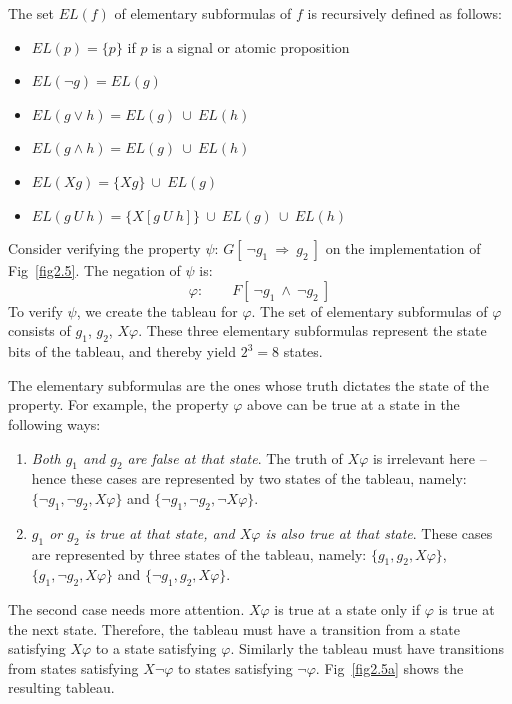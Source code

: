 \noindent
The set $EL(f)$ of elementary subformulas of $f$ is recursively defined as
follows:
\begin{itemize}
\item $EL(p) = \{p\}$ if $p$ is a signal or atomic proposition
\item $EL(\neg g) = EL(g)$
\item $EL(g \lor h) = EL(g)\ \cup\ EL(h)$
\item $EL(g \land h) = EL(g)\ \cup\ EL(h)$
\item $EL(Xg) = \{Xg\}\ \cup\ EL(g)$
\item $EL(g\ U\ h) =
        \{X[g\ U\ h]\}\ \cup\ EL(g)\ \cup\ EL(h)$
\end{itemize}
\noindent
Consider verifying the property $\psi$: $G[\ \neg g_1\ \Rightarrow \ g_2\ ]$
on the implementation of Fig~\ref{fig2.5}. The negation of $\psi$ is:
\[ \varphi: \qquad F[\ \neg g_1\ \land\ \neg g_2\ ] \] 
To verify $\psi$, we create the tableau for $\varphi$.
The set of elementary subformulas of $\varphi$
consists of  $g_1$, $g_2$, $X\varphi$. These three
elementary subformulas represent the state bits of the tableau, and thereby
yield $2^3 = 8$ states.

\noindent
The elementary subformulas are the ones whose truth dictates the state
of the property. For example, the property $\varphi$ above can be true at a
state in the following ways:
\begin{enumerate}

\item {\em Both $g_1$ and $g_2$ are false at that state}. The truth of
    $X\varphi$ is irrelevant here -- hence these cases are
    represented by two states of the tableau, namely:
    $\{\neg g_1, \neg g_2, X\varphi\}$ and
    $\{\neg g_1, \neg g_2, \neg X\varphi\}$.

\item {\em $g_1$ or $g_2$ is true at that state, and $X\varphi$ is
    also true at that state}. These cases are represented by three
    states of the tableau, namely: 
$\{g_1, g_2, X\varphi\}$, $\{g_1, \neg g_2, X\varphi\}$ and
    $\{\neg g_1, g_2, X\varphi\}$.
\end{enumerate}
\noindent
The second case needs more attention. $X\varphi$ is true at a state only
if $\varphi$ is true at the next state. Therefore, the tableau must have a
transition from a state satisfying $X\varphi$ to a state satisfying
$\varphi$. Similarly the tableau must have transitions from states
satisfying $X \neg \varphi$ to states satisfying $\neg \varphi$.
Fig~\ref{fig2.5a} shows the resulting tableau.

